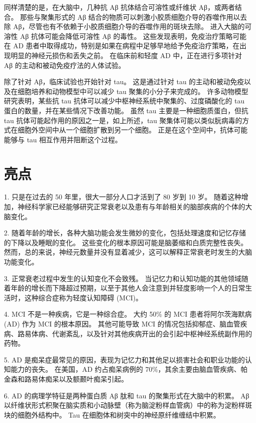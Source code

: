 同样清楚的是，在大脑中，几种抗 Aβ 抗体结合可溶性或纤维状 Aβ，或两者结合。 那些与聚集形式的 Aβ 结合的物质可以刺激小胶质细胞介导的吞噬作用以去除 Aβ，尽管也有不依赖于小胶质细胞介导的吞噬作用的斑块去除。 进入大脑的可溶性 Aβ 抗体可能会降低可溶性 Aβ 的毒性。 这些发现表明，免疫治疗策略可能在 AD 患者中取得成功，特别是如果在病程中足够早地给予免疫治疗策略，在出现明显的神经元损伤和丢失之前。 在临床前和轻度 AD 中，正在进行多项针对 Aβ 的主动和被动免疫疗法的人体试验。

除了针对 Aβ，临床试验也开始针对 tau。 这是通过针对 tau 的主动和被动免疫以及在细胞培养和动物模型中可以减少 tau 聚集的小分子来完成的。 许多动物模型研究表明，某些抗 tau 抗体可以减少中枢神经系统中聚集的、过度磷酸化的 tau 蛋白的数量，并在某些情况下改善功能。 虽然 tau 主要是一种细胞质蛋白，但抗 tau 抗体可能起作用的原因之一是，如上所述，tau 聚集体可能以类似朊病毒的方式在细胞外空间中从一个细胞扩散到另一个细胞。 正是在这个空间中，抗体可能能够与 tau 相互作用并阻断这个过程。

\section{亮点}
1. 只是在过去的 50 年里，很大一部分人口才活到了 80 岁到 10 岁。 随着这种增加，神经科学家已经能够研究正常衰老以及患有与年龄相关的脑部疾病的个体的大脑变化。 

2. 随着年龄的增长，各种大脑功能会发生微妙的变化，包括处理速度和记忆存储的下降以及睡眠的变化。 这些变化的根本原因可能是脑萎缩和白质完整性丧失。 然而，总的来说，神经元数量并没有显着减少，这可以解释正常衰老时发生的大脑功能变化。 

3. 正常衰老过程中发生的认知变化不会致残。 当记忆力和认知功能的其他领域随着年龄的增长而下降超过预期，以至于其他人会注意到并轻度影响一个人的日常生活时，这种综合症称为轻度认知障碍 (MCI)。 

4. MCI 不是一种疾病，它是一种综合症。 大约 50\% 的 MCI 患者将阿尔茨海默病 (AD) 作为 MCI 的根本原因。 其他可能导致 MCI 的情况包括抑郁症、脑血管疾病、路易体病、代谢紊乱，以及针对其他疾病开出的会引起中枢神经系统副作用的药物。 

5. AD 是痴呆症最常见的原因，表现为记忆力和其他足以损害社会和职业功能的认知能力的丧失。 在美国，AD 约占痴呆病例的 70\%，其余主要由脑血管疾病、帕金森和路易体痴呆以及额颞叶痴呆引起。 

6. AD 的病理学特征是两种蛋白质 Aβ 肽和 tau 的聚集形式在大脑中的积累。 Aβ 以纤维状形式积聚在脑实质和小动脉壁（称为脑淀粉样血管病）中的称为淀粉样斑块的细胞外结构中。 Tau 在细胞体和树突中的神经原纤维缠结中积累。 


